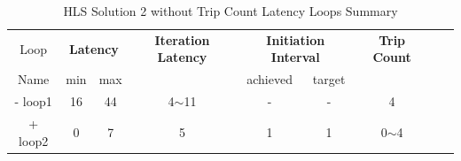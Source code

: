\begin{table}[H]
	\centering
	\begin{tabular}{|c|c|c|c|c|c|c|c|c|}
		\hline
		\multicolumn{1}{|c|}{Loop} & \multicolumn{2}{|c|}{\textbf{Latency}} & \multicolumn{1}{c|}{\textbf{Iteration Latency}} & \multicolumn{2}{c|}{\textbf{Initiation Interval}} & \multicolumn{1}{c|}{\textbf{Trip Count}}  \\
		Name & min & max &  & achieved & target &  \\
		\hline
		- loop1 & 16 & 44 & 4$\sim$11 & - & - & 4 \\
		+ loop2 & 0 & 7 & 5 & 1 & 1 & 0$\sim$4 \\
		\hline
	\end{tabular}
	\caption{HLS Solution 2 without Trip Count Latency Loops Summary}
	\label{tab:hls-solution-2-loop-summary}
\end{table}

